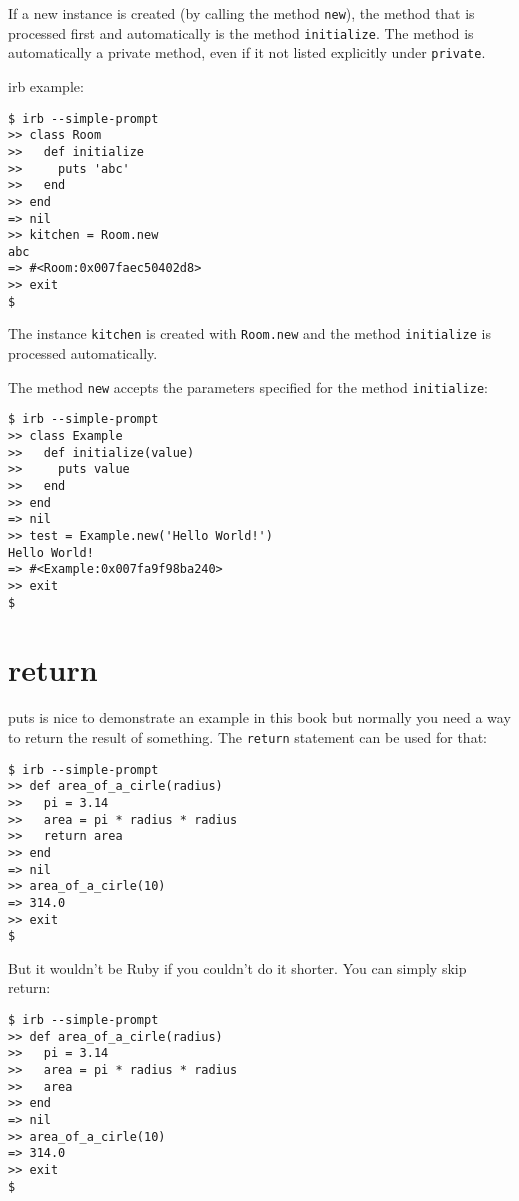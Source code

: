 \documentclass[a4paper]{book}
\begin{document}
If a new instance is created (by calling the method \texttt{new}), the method that is processed first and automatically is the method \texttt{initialize}. The method is automatically a private method, even if it not listed explicitly under \texttt{private}.

irb example:

\begin{shaded}\begin{verbatim}
$ irb --simple-prompt
>> class Room
>>   def initialize
>>     puts 'abc'
>>   end
>> end
=> nil
>> kitchen = Room.new
abc
=> #<Room:0x007faec50402d8>
>> exit
$
\end{verbatim}\end{shaded}

The instance \texttt{kitchen} is created with \texttt{Room.new} and the method \texttt{initialize} is processed automatically.

The method \texttt{new} accepts the parameters specified for the method \texttt{initialize}:

\begin{shaded}\begin{verbatim}
$ irb --simple-prompt
>> class Example
>>   def initialize(value)
>>     puts value
>>   end
>> end
=> nil
>> test = Example.new('Hello World!')
Hello World!
=> #<Example:0x007fa9f98ba240>
>> exit
$
\end{verbatim}\end{shaded}

\section{return}\label{return}

puts is nice to demonstrate an example in this book but normally you need a way to return the result of something. The \texttt{return} statement can be used for that:

\begin{shaded}\begin{verbatim}
$ irb --simple-prompt
>> def area_of_a_cirle(radius)
>>   pi = 3.14
>>   area = pi * radius * radius
>>   return area
>> end
=> nil
>> area_of_a_cirle(10)
=> 314.0
>> exit
$
\end{verbatim}\end{shaded}

But it wouldn't be Ruby if you couldn't do it shorter. You can simply skip return:

\begin{shaded}\begin{verbatim}
$ irb --simple-prompt
>> def area_of_a_cirle(radius)
>>   pi = 3.14
>>   area = pi * radius * radius
>>   area
>> end
=> nil
>> area_of_a_cirle(10)
=> 314.0
>> exit
$
\end{verbatim}\end{shaded}
\end{document}
